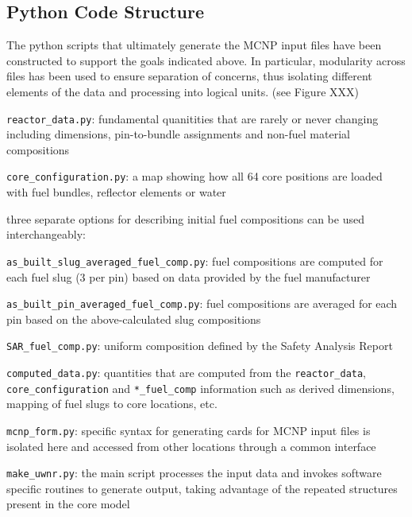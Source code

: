 \documentclass{UWNR_modeling}
\begin{document}
\subsection{Python Code Structure}\label{ssection:code_struct}

The python scripts that ultimately generate the MCNP input files have been
constructed to support the goals indicated above.  In particular, modularity
across files has been used to ensure separation of concerns, thus isolating
different elements of the data and processing into logical units.  (see Figure
XXX)

\begin{myitemize}
\item \texttt{reactor\_data.py}: fundamental quanitities that are rarely or never
  changing including dimensions, pin-to-bundle assignments and non-fuel
  material compositions
\item \texttt{core\_configuration.py}: a map showing how all 64 core positions are
  loaded with fuel bundles, reflector elements or water
\item three separate options for describing initial fuel compositions can be
  used interchangeably:

  \begin{myenumerate}
  \item \texttt{as\_built\_slug\_averaged\_fuel\_comp.py}: fuel compositions are
    computed for each fuel slug (3 per pin) based on data provided by the fuel
    manufacturer
  \item \texttt{as\_built\_pin\_averaged\_fuel\_comp.py}: fuel compositions are
    averaged for each pin based on the above-calculated slug compositions
  \item \texttt{SAR\_fuel\_comp.py}: uniform composition defined by the Safety Analysis
    Report
  \end{myenumerate}
\item \texttt{computed\_data.py}: quantities that are computed from the \texttt{reactor\_data},\\ \texttt{core\_configuration} and \texttt{*\_fuel\_comp} information such as derived dimensions, mapping of fuel slugs to core locations, etc.
\item \texttt{mcnp\_form.py}: specific syntax for generating cards for MCNP input files is isolated here and accessed from other locations through a common interface
\item \texttt{make\_uwnr.py}: the main script processes the input data and invokes software specific routines to generate output, taking advantage of the repeated structures present in the core model
\end{myitemize}
\end{document}
